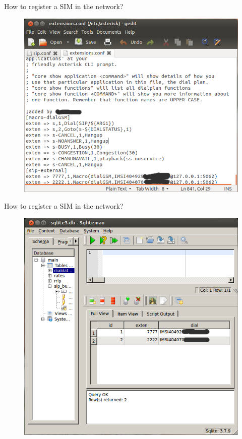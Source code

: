 \documentclass{beamer}
\begin{document}
  \begin{frame}{How to register a SIM in the network?}
    \begin{figure}
      \centering
      \includegraphics[width=0.7\linewidth]{img/ext_conf}
    \end{figure}
  \end{frame}
  
  \begin{frame}{How to register a SIM in the network?}
    \begin{figure}
      \centering
      \includegraphics[width=0.7\linewidth]{img/dialdata}
    \end{figure}
  \end{frame}
  
\end{document}
